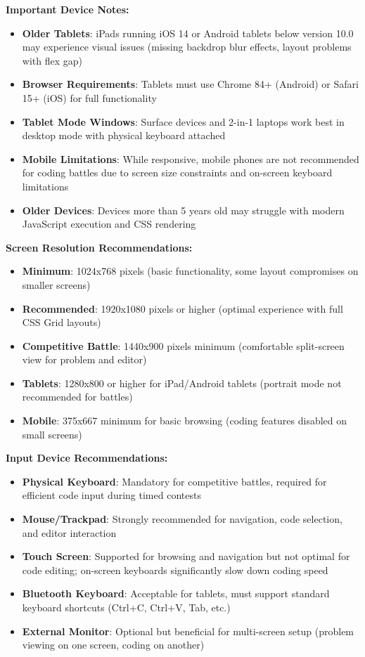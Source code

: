 \documentclass[12pt]{article}
\begin{document}
\clearpage
\begin{tcolorbox}
  

\textbf{Important Device Notes:}
\begin{itemize}
\item \textbf{Older Tablets}: iPads running iOS 14 or Android tablets below version 10.0 may experience visual issues (missing backdrop blur effects, layout problems with flex gap)
\item \textbf{Browser Requirements}: Tablets must use Chrome 84+ (Android) or Safari 15+ (iOS) for full functionality
\item \textbf{Tablet Mode Windows}: Surface devices and 2-in-1 laptops work best in desktop mode with physical keyboard attached
\item \textbf{Mobile Limitations}: While responsive, mobile phones are not recommended for coding battles due to screen size constraints and on-screen keyboard limitations
\item \textbf{Older Devices}: Devices more than 5 years old may struggle with modern JavaScript execution and CSS rendering
\end{itemize}
\end{tcolorbox}

\textbf{Screen Resolution Recommendations:}
\begin{itemize}
\item \textbf{Minimum}: 1024x768 pixels (basic functionality, some layout compromises on smaller screens)
\item \textbf{Recommended}: 1920x1080 pixels or higher (optimal experience with full CSS Grid layouts)
\item \textbf{Competitive Battle}: 1440x900 pixels minimum (comfortable split-screen view for problem and editor)
\item \textbf{Tablets}: 1280x800 or higher for iPad/Android tablets (portrait mode not recommended for battles)
\item \textbf{Mobile}: 375x667 minimum for basic browsing (coding features disabled on small screens)
\end{itemize}

\textbf{Input Device Recommendations:}
\begin{itemize}
\item \textbf{Physical Keyboard}: Mandatory for competitive battles, required for efficient code input during timed contests
\item \textbf{Mouse/Trackpad}: Strongly recommended for navigation, code selection, and editor interaction
\item \textbf{Touch Screen}: Supported for browsing and navigation but not optimal for code editing; on-screen keyboards significantly slow down coding speed
\item \textbf{Bluetooth Keyboard}: Acceptable for tablets, must support standard keyboard shortcuts (Ctrl+C, Ctrl+V, Tab, etc.)
\item \textbf{External Monitor}: Optional but beneficial for multi-screen setup (problem viewing on one screen, coding on another)
\end{itemize}
\end{document}
